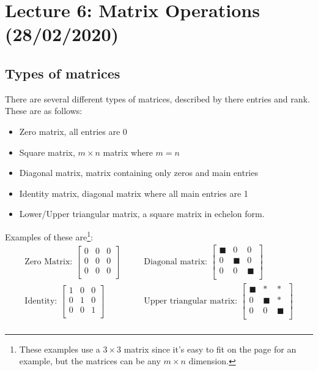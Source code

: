 \documentclass[11pt, a4paper]{article}
\begin{document}
\setcounter{section}{5}
\section{Lecture 6: Matrix Operations (28/02/2020)}
\subsection{Types of matrices}
There are several different types of matrices, described by there entries and rank. These are as follows:
\begin{itemize}
  \item Zero matrix, all entries are 0
  \item Square matrix, $m\times n$ matrix where $m = n$
  \item Diagonal matrix, matrix containing only zeros and main entries
  \item Identity matrix, diagonal matrix where all main entries are 1
  \item Lower/Upper triangular matrix, a square matrix in echelon form.
\end{itemize}

Examples of these are\footnote{These examples use a $3 \times 3$ matrix since it's easy to fit on the page for an example, but the matrices
can be any $m \times n$ dimension.}: 
\begin{align*}
  \text{Zero Matrix: }
  \begin{bmatrix}
    0 & 0 & 0\\
    0 & 0 & 0\\
    0 & 0 & 0\\
  \end{bmatrix}&
  \qquad \text{Diagonal matrix: }
  \begin{bmatrix}
    \blacksquare & 0 & 0\\
    0 & \blacksquare & 0\\
    0 & 0 & \blacksquare\\
  \end{bmatrix}
  \\
  \text{Identity: }
  \begin{bmatrix}
    1 & 0 & 0\\
    0 & 1 & 0\\
    0 & 0 & 1\\
  \end{bmatrix}&
  \qquad \text{Upper triangular matrix: }
  \begin{bmatrix}
    \blacksquare & * & *\\
    0 & \blacksquare & *\\
    0 & 0 & \blacksquare\\
  \end{bmatrix}
  \\
\end{align*}
\end{document}
